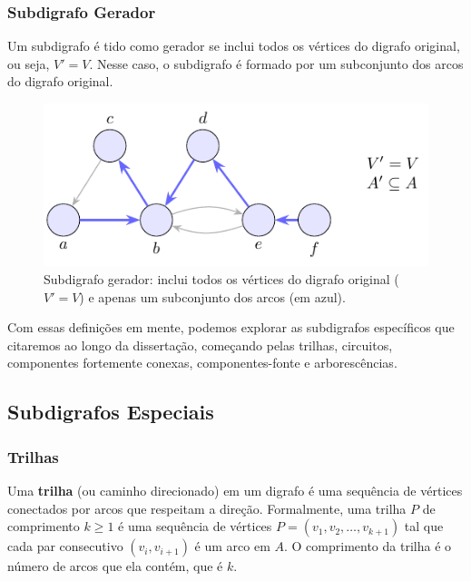 \subsubsection{Subdigrafo Gerador}

Um subdigrafo é tido como gerador se inclui todos os vértices do digrafo original, ou seja, \(V' = V\). Nesse caso, o subdigrafo é formado por um subconjunto dos arcos do digrafo original.


\begin{figure}[H]
	\centering
	\includegraphics[width=0.9\linewidth]{figures/fig_subdigrafo_gerador.pdf}

	\caption{Subdigrafo gerador: inclui todos os vértices do digrafo original ($V'=V$) e apenas um subconjunto dos arcos (em azul).}
	\label{fig:subdigrafo-gerador}\end{figure}



Com essas definições em mente, podemos explorar as subdigrafos específicos que citaremos ao longo da dissertação, começando pelas trilhas, circuitos, componentes fortemente conexas, componentes-fonte e arborescências.

\subsection{Subdigrafos Especiais}

\subsubsection{Trilhas}


Uma \textbf{trilha} (ou caminho direcionado) em um digrafo é uma sequência de vértices conectados por arcos que respeitam a direção. Formalmente, uma trilha \(P\) de comprimento \(k \geq 1\) é uma sequência de vértices \(P = (v_1, v_2, \ldots, v_{k+1})\) tal que cada par consecutivo \((v_i, v_{i+1})\) é um arco em \(A\). O comprimento da trilha é o número de arcos que ela contém, que é \(k\).



